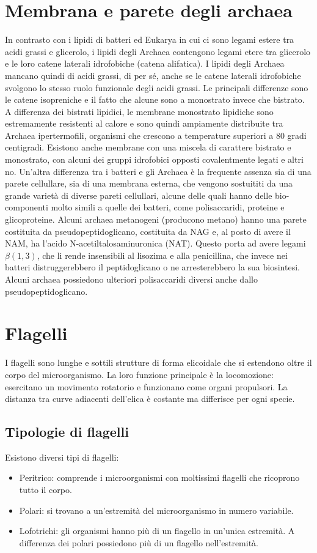 \section{Membrana e parete degli archaea}
In contrasto con i lipidi di batteri ed Eukarya in cui ci sono legami estere tra acidi grassi e glicerolo, i lipidi degli Archaea contengono legami etere
tra glicerolo e le loro catene laterali idrofobiche (catena alifatica). I lipidi degli Archaea mancano quindi di acidi grassi, di per sé, anche se le catene
laterali idrofobiche svolgono lo stesso ruolo funzionale degli acidi grassi.
Le principali differenze sono le catene isopreniche e il fatto che alcune sono
a monostrato invece che bistrato. A differenza dei bistrati lipidici, le membrane monostrato lipidiche sono estremamente resistenti al calore e sono quindi
ampiamente distribuite tra Archaea ipertermofili, organismi che crescono a temperature superiori a 80 gradi centigradi. Esistono anche membrane con una
miscela di carattere bistrato e monostrato, con alcuni dei gruppi idrofobici opposti covalentmente legati e altri no. Un’altra differenza tra i batteri e
gli Archaea è la frequente assenza sia di una parete cellullare, sia di una membrana esterna, che vengono sostuititi da una grande varietà di diverse pareti
cellullari, alcune delle quali hanno delle bio-componenti molto simili a quelle dei batteri, come polisaccaridi, proteine e glicoproteine. Alcuni archaea
metanogeni (producono metano) hanno una parete costituita da pseudopeptidoglicano, costituita da NAG e, al posto di avere il NAM, ha
l’acido N-acetiltalosaminuronica (NAT). Questo porta ad avere legami $\beta(1, 3)$, che li rende insensibili al lisozima e
alla penicillina, che invece nei batteri distruggerebbero il peptidoglicano o ne arresterebbero la sua biosintesi. Alcuni archaea possiedono ulteriori polisaccaridi diversi anche dallo
pseudopeptidoglicano.

\section{Flagelli}
I flagelli sono lunghe e sottili strutture di forma elicoidale che si estendono oltre il corpo del microorganismo.
La loro funzione principale \`e la locomozione: esercitano un movimento rotatorio e funzionano come organi propulsori.
La distanza tra curve adiacenti dell'elica \`e costante ma differisce per ogni specie.

	\subsection{Tipologie di flagelli}
	Esistono diversi tipi di flagelli:
	\begin{itemize}
		\item Peritrico: comprende i microorganismi con moltissimi flagelli che ricoprono tutto il corpo.
		\item Polari: si trovano a un'estremit\`a del microorganismo in numero variabile.
		\item Lofotrichi: gli organismi hanno pi\`u di un flagello in un'unica estremit\`a.
			A differenza dei polari possiedono pi\`u di un flagello nell'estremit\`a.
	\end{itemize}

